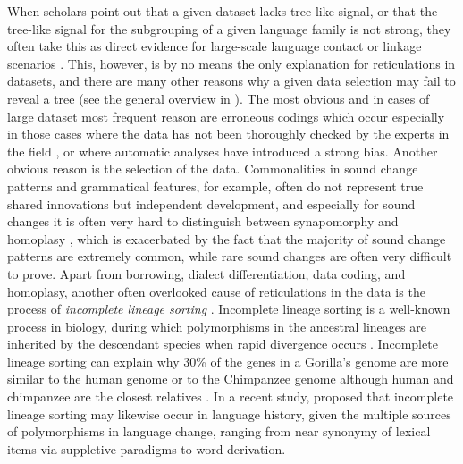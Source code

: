 \documentclass[svgnames,12pt]{scrartcl}
\begin{document}
{{When scholars point out that a given dataset lacks tree-like signal, or that the tree-like signal
for the subgrouping of a given language family is not strong, they often take this as direct
evidence for large-scale language contact or linkage scenarios \citep{Ross1988}.  This, however, is
by no means the only explanation for reticulations in datasets, and there are many other reasons why a given
data selection may fail to reveal a tree (see the general overview in
\citealt[44-66]{Morrison2011}). The most obvious and in cases of large dataset most frequent reason
are erroneous codings which occur especially in those cases where the data has not been thoroughly
checked by the experts in the field \citep{Geisler2010}, or where automatic analyses have introduced
a strong bias. Another obvious reason is the selection of the data. Commonalities in sound change
patterns and grammatical features, for example, often do not represent true shared innovations but
independent development, and especially for sound changes it is often very hard to distinguish
between synapomorphy and homoplasy \citep[182f]{Chacon2015a}, which is exacerbated by the fact that
the majority of sound change patterns are extremely common, while rare sound changes are often very
difficult to prove. Apart from borrowing, dialect differentiation, data coding, and homoplasy,
another often overlooked cause of reticulations in the data is the process of \emph{incomplete
lineage sorting} \citep{Galtier2008}. Incomplete lineage sorting is a well-known process in
biology, during which polymorphisms in the ancestral lineages are inherited by the descendant
species when rapid divergence occurs \citep{Rogers2014}. Incomplete lineage sorting can explain 
why 30\% of the genes in a Gorilla's genome are more similar to the human genome or to the
Chimpanzee genome although human and chimpanzee are the closest relatives \citep{Scally2012}. 
In a recent study, \citet{List2016h} proposed that incomplete lineage sorting may likewise occur in
language history, given  
the multiple sources of polymorphisms in language change, ranging from near synonymy of lexical
items via suppletive paradigms to word derivation.
 
}}
\end{document}
